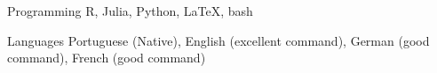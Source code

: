 

\begin{cvskills}

  \cvskill
    {Programming} %
    {R, Julia, Python, LaTeX, bash} %

  \cvskill
    {Languages} %
    {Portuguese (Native), English (excellent command), 
    German (good command), French (good command)} %

\end{cvskills}
